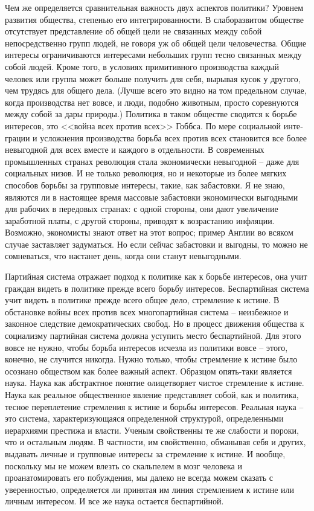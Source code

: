 \documentclass{book}
\begin{document}
Чем же определяется сравнительная важность двух аспектов политики? Уровнем развития общества, степенью его интегрированности. В слаборазвитом обществе отсутствует представ­ление об общей цели не связанных между собой непосредствен­но групп людей, не говоря уж об общей цели человечества. Общие интересы ограничиваются интересами небольших групп тесно связанных между собой людей. Кроме того, в условиях примитивного производства каждый человек или группа может больше получить для себя, вырывая кусок у другого, чем тру­дясь для общего дела. (Лучше всего это видно на том предель­ном случае, когда производства нет вовсе, и люди, подобно животным, просто соревнуются между собой за дары природы.) Политика в таком обществе сводится к борьбе интересов, это <<война всех против всех>> Гоббса. По мере социальной инте­грации и усложнения производства борьба всех против всех становится все более невыгодной для всех вместе и каждого в отдельности. В современных промышленных странах революция стала экономически невыгодной --  
даже для со­циальных низов. И не только революция, но и некоторые из более мягких способов борьбы за групповые интересы, такие, как забастовки. Я не знаю, являются ли в настоящее время массовые забастовки экономически выгодными для рабочих в передовых странах: с одной стороны, они дают увеличение заработной платы, с другой стороны, приводят к возрастанию инфляции. Возможно, экономисты знают ответ на этот вопрос; пример Англии во всяком случае заставляет задуматься. Но если сейчас забастовки и выгодны, то можно не сомневаться, что настанет день, когда они станут невыгодными.

Партийная система отражает подход к политике как к борь­бе интересов, она учит граждан видеть в политике прежде всего борьбу интересов. Беспартийная система учит видеть в политике прежде всего общее дело, стремление к истине. В обстанов­ке войны всех против всех многопартийная система -- неиз­бежное и законное следствие демократических свобод. Но в процесс движения общества к социализму партийная система должна уступить место беспартийной. Для этого вовсе не нуж­но, чтобы борьба интересов исчезла из политики вовсе -- этого, конечно, не случится никогда. Нужно только, чтобы стремле­ние к истине было осознано обществом как более важный аспект. Образцом опять-таки является наука. Наука как абстрактное понятие олицетворяет чистое стремление к истине. Наука как реальное общественное явление представляет собой, как и политика, тесное переплетение стремления к истине и борьбы интересов. Реальная наука -- это система, характеризующаяся определенной структурой, определенными иерархиями престижа и власти. Ученым 
свойственны те же слабости и пороки, что и остальным людям. В частности, им свойственно, обманывая себя и других, выдавать личные и групповые интересы за стремление к истине. И вообще, поскольку мы не можем влезть со скальпелем в мозг человека и проанатомировать его побуждения, мы далеко не всегда можем сказать с уверенностью, определяется ли принятая им линия стремле­нием к истине или личным интересом. И все же наука остает­ся беспартийной.
\end{document}
